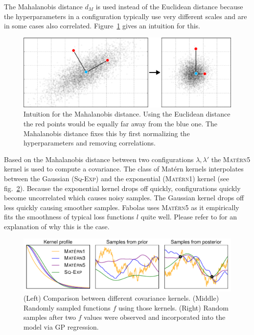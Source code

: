 The Mahalanobis distance \(d_M\) is used instead of the Euclidean distance because the hyperparameters in a configuration typically use very different scales and are in some cases also correlated.
Figure~\ref{fig:fabolas:mahalanobis} gives an intuition for this.
\begin{figure}[t]
	\centering
	\includegraphics[width=0.7\linewidth]{gfx/fabolas/mahalanobisDistance.pdf}
	\caption{
		Intuition for the Mahalanobis distance.
		Using the Euclidean distance the red points would be equally far away from the blue one.
		The Mahalanobis distance fixes this by first normalizing the hyperparameters and removing correlations.
	}\label{fig:fabolas:mahalanobis}
\end{figure}

Based on the Mahalanobis distance between two configurations \(\lambda, \lambda'\) the \textsc{Matérn5} kernel is used to compute a covariance.
The class of Matérn kernels interpolates between the Gaussian (\textsc{Sq-Exp}) and the exponential (\textsc{Matérn1}) kernel (see fig.~\ref{fig:fabolas:matern}).
Because the exponential kernel drops off quickly, configurations quickly become uncorrelated which causes noisy samples.
The Gaussian kernel drops off less quickly causing smoother samples.
Fabolas uses \textsc{Matérn5} as it empirically fits the smoothness of typical loss functions \(l\) quite well.
Please refer to \citet{Schoen2017} for an explanation of why this is the case.
\begin{figure}[t]
	\centering
	\includegraphics[width=0.75\linewidth]{gfx/fabolas/matern.pdf}
	\caption{
		(Left) Comparison between different covariance kernels.
		(Middle) Randomly sampled functions \(f\) using those kernels.
		(Right) Random samples after two \(f\) values were observed and incorporated into the model via GP regression.
	}\label{fig:fabolas:matern}
\end{figure}

